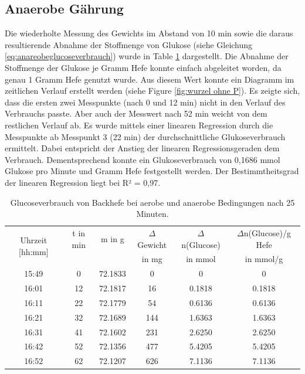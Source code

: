 \documentclass[10pt,a4paper]{article}
\begin{document}
	\subsection{Anaerobe Gährung}
	Die wiederholte Messung des Gewichts im Abstand von 10 min sowie die daraus resultierende Abnahme der Stoffmenge von Glukose (siehe Gleichung \ref{eq:anareobeglucoseverbrauch}) wurde in Table \ref{tab:anaerobe glucoseverbrauch} dargestellt. Die Abnahme der Stoffmenge der Glukose je Gramm Hefe konnte einfach abgeleitet worden, da genau 1 Gramm Hefe genutzt wurde. Aus diesem Wert konnte ein Diagramm im zeitlichen Verlauf erstellt werden (siehe Figure \ref{fig:wurzel ohne P}). Es zeigte sich, dass die ersten zwei Messpunkte (nach 0 und 12 min) nicht in den Verlauf des Verbrauchs passte. Aber auch der Messwert nach 52 min weicht von dem restlichen Verlauf ab. Es wurde mittels einer linearen Regression durch die Messpunkte ab Messpunkt 3 (22 min) der durchschnittliche Glukoseverbrauch ermittelt. Dabei entspricht der Anstieg der linearen Regressionsgeraden dem Verbrauch. Dementsprechend konnte ein Glukoseverbrauch von 0,1686 mmol Glukose pro Minute und Gramm Hefe festgestellt werden. Der Bestimmtheitsgrad der linearen Regression liegt bei R² = 0,97.
	
	\begin{table}[H]
		\centering
		\caption{Glucoseverbrauch von Backhefe bei aerobe und anaerobe Bedingungen nach 25 Minuten.}
		\label{tab:anaerobe glucoseverbrauch}
		\begin{tabular}{cccccc}
			\toprule
			\multirow{2}{*}{Uhrzeit [hh:mm]}& t in min & m in g & $\Delta$ Gewicht & $\Delta$ n(Glucose) & $\Delta$n(Glucose)/g Hefe\\
			& && in mg & in mmol&  in mmol/g\\
			\midrule
			15:49 & 0 & 72.1833 & 0 & 0 & 0\\
			16:01 & 12 & 72.1817 & 16 & 0.1818 & 0.1818\\
			16:11 & 22 & 72.1779 & 54 & 0.6136 & 0.6136\\
			16:21 & 32 & 72.1689 & 144 & 1.6363 & 1.6363\\
			16:31 & 41 & 72.1602 & 231 & 2.6250 & 2.6250\\
			16:42 & 52 &72.1356 & 477 & 5.4205 & 5.4205\\
			16:52 & 62 & 72.1207 & 626 & 7.1136 & 7.1136\\
			\bottomrule
		\end{tabular}
	\end{table}	
	
\end{document}
